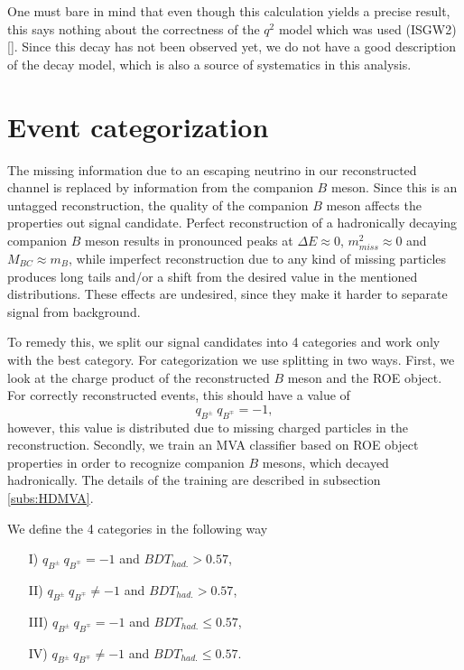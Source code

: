 \documentclass[oneside,a4paper,openany,12pt]{scrbook}
\begin{document}
One must bare in mind that even though this calculation yields a precise result, this says nothing about the correctness of the $q^2$ model which was used (ISGW2) []. Since this decay has not been observed yet, we do not have a good description of the decay model, which is also a source of systematics in this analysis.

\section{Event categorization}

The missing information due to an escaping neutrino in our reconstructed channel is replaced by information from the companion $B$ meson. Since this is an untagged reconstruction, the quality of the companion $B$ meson affects the properties out signal candidate. Perfect reconstruction of a hadronically decaying companion $B$ meson results in pronounced peaks at $\Delta E \approx 0$, $m_{miss}^2 \approx 0$ and $M_{BC} \approx m_B$, while imperfect reconstruction due to any kind of missing particles produces long tails and/or a shift from the desired value in the mentioned distributions. These effects are undesired, since they make it harder to separate signal from background.

To remedy this, we split our signal candidates into 4 categories and work only with the best category. For categorization we use splitting in two ways. First, we look at the charge product of the reconstructed $B$ meson and the ROE object. For correctly reconstructed events, this should have a value of $$q_{B^\pm}~q_{B^\mp} = -1,$$
however, this value is distributed due to missing charged particles in the reconstruction. Secondly, we train an MVA classifier based on ROE object properties in order to recognize companion $B$ mesons, which decayed hadronically. The details of the training are described in subsection \ref{subs:HDMVA}.

We define the 4 categories in the following way
\begin{enumerate} 
\item[I)] $q_{B^\pm}~q_{B^\mp} = -1$ and $BDT_{had.} > 0.57$,
\item[II)] $q_{B^\pm}~q_{B^\mp} \neq -1$ and $BDT_{had.} > 0.57$,
\item[III)] $q_{B^\pm}~q_{B^\mp} = -1$ and $BDT_{had.} \leq 0.57$,
\item[IV)] $q_{B^\pm}~q_{B^\mp} \neq -1$ and $BDT_{had.} \leq 0.57$.
\end{enumerate}
\end{document}
